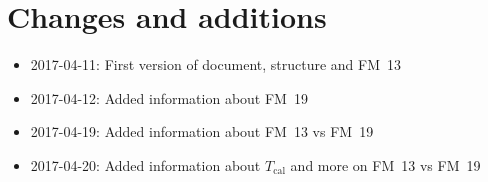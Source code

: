 \chapter{Changes and additions}
\begin{itemize}
    \item 2017-04-11: First version of document, structure and FM~13
    \item 2017-04-12: Added information about FM~19
    \item 2017-04-19: Added information about FM~13 vs FM~19
    \item 2017-04-20: Added information about $T_\mathrm{cal}$
                      and more on FM~13 vs FM~19
\end{itemize}
